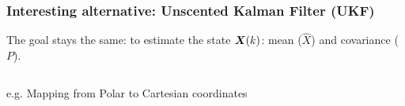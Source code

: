 \begin{frame}\frametitle{Interesting alternative: Unscented Kalman Filter (UKF)}
The goal stays the same: to estimate the state $\boldsymbol{X}(k)$: mean ($\hat{X}$) and covariance ($P$). %
\vspace{-5pt}
\begin{columns}
	\begin{block}{e.g. Mapping from Polar to Cartesian coordinates}
	\centering
	\begin{figure}
	 \\
	 \\
	\end{figure}
	\end{block} 


\end{columns}
\end{frame}
